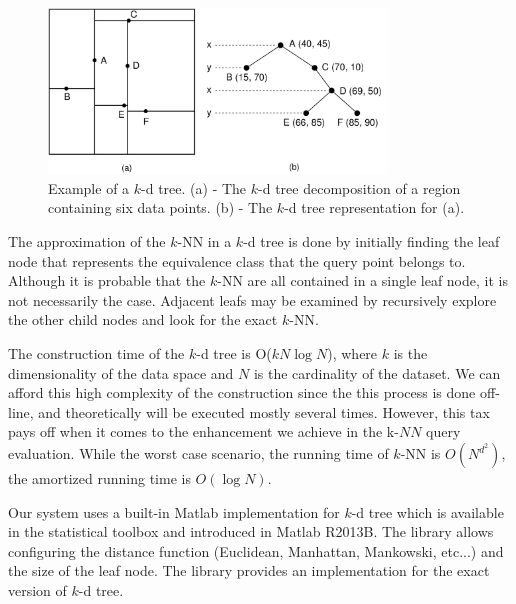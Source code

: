 \begin{figure}
\centering
\includegraphics[width=0.8\textwidth]{./figures/kd_tree}       
\caption{Example of a $k$-d tree. (a) - The $k$-d tree decomposition of a region containing six data points. (b) - The $k$-d tree representation for (a).}
\label{fig:kd_tree}
\end{figure}

\iftoggle{edit-mode}{\hspace{0pt}\marginpar{How the NN are found?}}{}
The approximation of the $k$-NN in a $k$-d tree is done by initially finding the leaf node that represents the equivalence class that the query point belongs to. 
Although it is probable that the $k$-NN are all contained in a single leaf node, it is not necessarily the case. 
Adjacent leafs may be examined by recursively explore the other child nodes and look for the exact $k$-NN. 
 
\iftoggle{edit-mode}{\hspace{0pt}\marginpar{Expected time complexity}}{}
The construction time of the $k$-d tree is O($k N \log N$), where $k$ is the dimensionality of the data space and $N$ is the cardinality of the dataset. 
We can afford this high complexity of the construction since the this process is done off-line, and theoretically will be executed mostly several times. 
However, this tax pays off when it comes to the enhancement we achieve in the k-$NN$ query evaluation. 
While the worst case scenario, the running time of $k$-NN is $O(N^{d^2})$, the amortized running time is $O(\log N)$.

\iftoggle{edit-mode}{\hspace{0pt}\marginpar{The Matlab library}}{} 
Our system uses a built-in Matlab implementation for $k$-d tree which is available in the statistical toolbox and introduced in Matlab R2013B. 
The library allows configuring the distance function (Euclidean, Manhattan, Mankowski, etc...) and the size of the leaf node. 
The library provides an implementation for the exact version of $k$-d tree.

